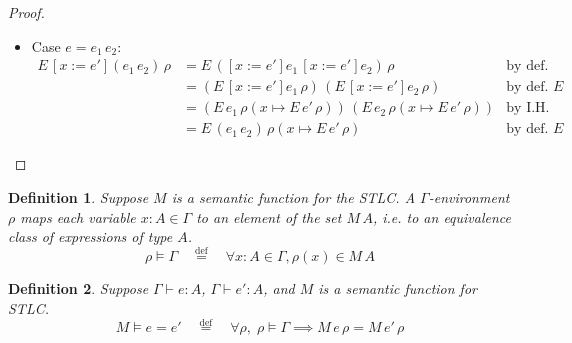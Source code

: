 \documentclass{tufte-handout}
\newcommand{\defeq}[0]{\overset{\mathrm{def}}{=}}
\newcommand{\APP}[0]{\,}
\newcommand{\by}[0]{\!:=\!}
\newcommand{\ext}[3]{#3(#1{\mapsto}#2)}
\newtheorem{definition}{Definition}%
\begin{document}
\begin{proof}
\begin{itemize}
  \item Case $e=e_1 \APP e_2$:
    \begin{align*}
      E\,[x\by e'](e_1 \APP e_2)\,\rho
      &= E\,([x\by e']e_1 \APP [x\by e']e_2)\,\rho & \text{by def. substitution}\\
      &= (E\,[x\by e']e_1\,\rho) \APP (E\,[x\by e']e_2\,\rho) & \text{by def. $E$} \\
      &= (E\,e_1\,\ext{x}{E\,e'\,\rho}{\rho}) \APP
      (E\,e_2\,\ext{x}{E\,e'\,\rho}{\rho}) & \text{by I.H.} \\
      &= E\,(e_1 \APP e_2)\,\ext{x}{E\,e'\,\rho}{\rho} & \text{by def. $E$}
    \end{align*}
  \end{itemize}
\end{proof}


\begin{definition}
Suppose $M$ is a semantic function for the STLC.  A
$\Gamma$-environment $\rho$ maps each variable $x : A \in \Gamma$ to
an element of the set $M\,A$, i.e. to an equivalence class of
expressions of type $A$.
\[
  \rho \models \Gamma \quad\defeq\quad \forall x:A \in \Gamma, \rho(x) \in M\,A
\]
\end{definition}

\begin{definition}
  Suppose $\Gamma \vdash e : A$, $\Gamma \vdash e' : A$, and $M$ is a
  semantic function for STLC.
  \[
  M \models e = e' \quad \defeq \quad \forall \rho,\;
  \rho \models \Gamma \implies M\,e\,\rho = M\,e'\,\rho
  \]
\end{definition}
\end{document}

